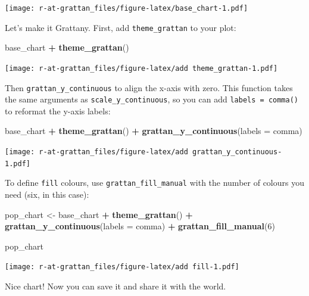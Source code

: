 \documentclass[]{book}
\newenvironment{Shaded}{\begin{snugshade}}{\end{snugshade}}
\newcommand{\DataTypeTok}[1]{\textcolor[rgb]{0.13,0.29,0.53}{#1}}
\newcommand{\DecValTok}[1]{\textcolor[rgb]{0.00,0.00,0.81}{#1}}
\newcommand{\KeywordTok}[1]{\textcolor[rgb]{0.13,0.29,0.53}{\textbf{#1}}}
\newcommand{\NormalTok}[1]{#1}
\newcommand{\OperatorTok}[1]{\textcolor[rgb]{0.81,0.36,0.00}{\textbf{#1}}}
\newcommand{\StringTok}[1]{\textcolor[rgb]{0.31,0.60,0.02}{#1}}
\begin{document}
\texttt{[image: r-at-grattan\_files/figure-latex/base\_chart-1.pdf]}

Let's make it Grattany. First, add \texttt{theme\_grattan} to your plot:

\begin{Shaded}
\begin{Highlighting}[]
\NormalTok{base_chart }\OperatorTok{+}
\StringTok{        }\KeywordTok{theme_grattan}\NormalTok{()}
\end{Highlighting}
\end{Shaded}

\texttt{[image: r-at-grattan\_files/figure-latex/add theme\_grattan-1.pdf]}

Then \texttt{grattan\_y\_continuous} to align the x-axis with zero. This function takes the same arguments as \texttt{scale\_y\_continuous}, so you can add \texttt{labels\ =\ comma()} to reformat the y-axis labels:

\begin{Shaded}
\begin{Highlighting}[]
\NormalTok{base_chart }\OperatorTok{+}
\StringTok{        }\KeywordTok{theme_grattan}\NormalTok{() }\OperatorTok{+}
\StringTok{        }\KeywordTok{grattan_y_continuous}\NormalTok{(}\DataTypeTok{labels =}\NormalTok{ comma)}
\end{Highlighting}
\end{Shaded}

\texttt{[image: r-at-grattan\_files/figure-latex/add grattan\_y\_continuous-1.pdf]}

To define \texttt{fill} colours, use \texttt{grattan\_fill\_manual} with the number of colours you need (six, in this case):

\begin{Shaded}
\begin{Highlighting}[]
\NormalTok{pop_chart <-}\StringTok{ }\NormalTok{base_chart }\OperatorTok{+}
\StringTok{        }\KeywordTok{theme_grattan}\NormalTok{() }\OperatorTok{+}
\StringTok{        }\KeywordTok{grattan_y_continuous}\NormalTok{(}\DataTypeTok{labels =}\NormalTok{ comma) }\OperatorTok{+}
\StringTok{        }\KeywordTok{grattan_fill_manual}\NormalTok{(}\DecValTok{6}\NormalTok{)}

\NormalTok{pop_chart}
\end{Highlighting}
\end{Shaded}

\texttt{[image: r-at-grattan\_files/figure-latex/add fill-1.pdf]}

Nice chart! Now you can save it and share it with the world.
\end{document}
